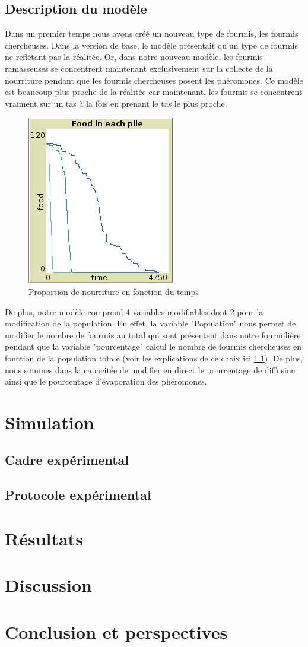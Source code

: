 \documentclass{article}
\begin{document}
\subsection{Description du modèle}
Dans un premier temps nous avons créé un nouveau type de fourmis, les fourmis chercheuses. Dans la version de base, le modèle présentait qu'un type de fourmis ne reflétant pas la réalitée. Or, dans notre nouveau modèle, les fourmis ramasseuses se concentrent maintenant exclusivement sur la collecte de la nourriture pendant que les fourmis chercheuses posent les phéromones. Ce modèle est beaucoup plus proche de la réalitée car maintenant, les fourmis se concentrent vraiment sur un tas à la fois en prenant le tas le plus proche.
\begin{figure}[h]
\centering
\includegraphics[scale=0.6]{contenue/2antstype.jpg} 
\caption{Proportion de nourriture en fonction du temps}
\label{fig:Tas}
\end{figure}
De plus, notre modèle comprend 4 variables modifiables dont 2 pour la modification de la population. En effet, la variable "Population" nous permet de modifier le nombre de fourmis au total qui sont présentent dans notre fourmilière pendant que la variable "pourcentage" calcul le nombre de fourmis chercheuses en fonction de la population totale (voir les explications de ce choix ici \ref{pourcentage}). De plus, nous sommes dans la capacitée de modifier en direct le pourcentage de diffusion ainsi que le pourcentage d'évaporation des phéromones.
\section{Simulation}
\subsection{Cadre expérimental}

\label{pourcentage}

\subsection{Protocole expérimental}
\section{Résultats}
\section{Discussion}
\section*{Conclusion et perspectives}
\end{document}
